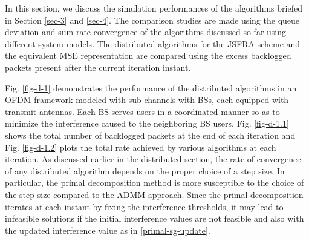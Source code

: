 In this section, we discuss the simulation performances of the algorithms briefed in Section \ref{sec-3} and \ref{sec-4}. The comparison studies are made using the queue deviation and sum rate convergence of the algorithms discussed so far using different system models. The distributed algorithms for the \ac{JSFRA} scheme and the equivalent \ac{MSE} representation are compared using the excess backlogged packets present after the current iteration instant.

Fig. \ref{fig-d-1} demonstrates the performance of the distributed algorithms in an \ac{OFDM} framework modeled with  sub-channels with  \acp{BS}, each equipped with  transmit antennas. Each \ac{BS} serves  users in a coordinated manner so as to minimize the interference caused to the neighboring \ac{BS} users. Fig. \ref{fig-d-1.1} shows the total number of backlogged packets at the end of each iteration and Fig. \ref{fig-d-1.2} plots the total rate achieved by various algorithms at each iteration. As discussed earlier in the distributed section, the rate of convergence of any distributed algorithm depends on the proper choice of a step size. In particular, the primal decomposition method is more susceptible to the choice of the step size compared to the \ac{ADMM} approach. Since the primal decomposition iterates at each instant by fixing the interference thresholds, it may lead to infeasible solutions if the initial interference values are not feasible and also with the updated interference value as in \eqref{primal-sg-update}.

